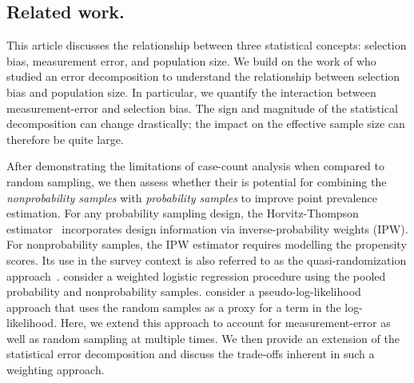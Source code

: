 \documentclass[11pt]{amsart}
\begin{document}
\subsection{Related work.}

This article discusses the relationship between three statistical concepts: selection bias, measurement error, and population size.  We build on the work of \cite{Meng2018} who studied an error decomposition to understand the relationship between selection bias and population size.  In particular, we quantify the interaction between measurement-error and selection bias.  The sign and magnitude of the statistical decomposition can change drastically; the impact on the effective sample size can therefore be quite large.

After demonstrating the limitations of case-count analysis when compared to random sampling, we then assess whether their is potential for combining the \emph{nonprobability samples} with \emph{probability samples} to improve point prevalence estimation. For any probability sampling design, the Horvitz-Thompson estimator~\citep{HT1952} incorporates design information via inverse-probability weights (IPW).  For nonprobability samples, the IPW estimator requires modelling the propensity scores.  Its use in the survey context is also referred to as the quasi-randomization approach~\citep{Elliott2017}. \cite{Valliant2011} consider a weighted logistic regression procedure using the pooled probability and nonprobability samples.  \cite{Chen2019} consider a pseudo-log-likelihood approach that uses the random samples as a proxy for a term in the log-likelihood.  Here, we extend this approach to account for measurement-error as well as random sampling at multiple times. We then provide an extension of the statistical error decomposition and discuss the trade-offs inherent in such a weighting approach.
\end{document}
